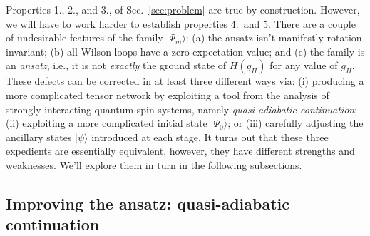 \documentclass[twocolumn,lengthcheck,superscriptaddress]{revtex4-1}
\theoremstyle{definition}
\theoremstyle{remark}
\begin{document}
Properties 1., 2., and 3., of Sec.~\ref{sec:problem} are true by construction. However, we will have to work harder to establish properties 4.\ and 5. There are a couple of undesirable features of the family $|\Psi_m\rangle$: (a) the ansatz isn't manifestly rotation invariant; (b) all Wilson loops have a zero expectation value; and (c) the family is an \emph{ansatz}, i.e., it is not \emph{exactly} the ground state of $H(g_H)$ for any value of $g_H$. These defects can be corrected in at least three different ways via: (i) producing a more complicated tensor network by exploiting a tool from the analysis of strongly interacting quantum spin systems, namely \emph{quasi-adiabatic continuation}; (ii) exploiting a more complicated initial state $|\Psi_0\rangle$; or (iii) carefully adjusting the ancillary states $|\psi\rangle$ introduced at each stage. It turns out that these three expedients are essentially equivalent, however, they have different strengths and weaknesses. We'll explore them in turn in the following subsections.  

\subsection{Improving the ansatz: quasi-adiabatic continuation}
\end{document}
